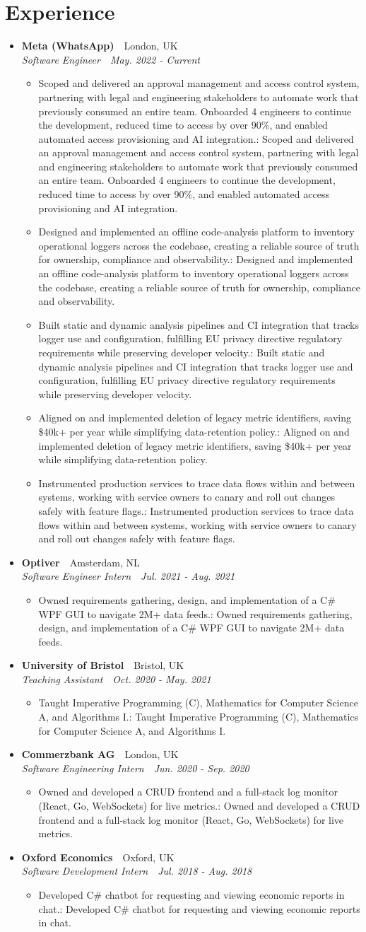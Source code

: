 \documentclass[a4paper,11pt]{article}
\def\ifempty#1{\def\temp{#1}\ifx\temp\empty}
\newcommand{\resumeItem}[2]{
  \item\small{
    \ifempty{#1}#2\else\textbf{#1}{: #2\vspace{-2pt}}\fi
  }
}
\newcommand{\resumeSubheading}[4]{
  \vspace{-1pt}\item[]
    \textbf{#1}~\hfill~#2 \\
    \textit{\small#3}~\hfill~\textit{\small#4}
  \vspace{-5pt}
}
\newcommand{\resumeSubHeadingListStart}{\begin{itemize}[leftmargin=0pt, label={}, itemindent=0pt]}
\newcommand{\resumeSubHeadingListEnd}{\end{itemize}}
\newcommand{\resumeItemListStart}{\begin{itemize}[leftmargin=0.15in]}
\newcommand{\resumeItemListEnd}{\end{itemize}\vspace{-5pt}}
\begin{document}
\section{Experience}
  \resumeSubHeadingListStart
    \resumeSubheading
      {Meta (WhatsApp)}{London, UK}
      {Software Engineer}{May. 2022 - Current}
      \resumeItemListStart
        \resumeItem{}
          {Scoped and delivered an approval management and access control system, partnering with legal and engineering stakeholders to automate work that previously consumed an entire team. Onboarded 4 engineers to continue the development, reduced time to access by over 90\%, and enabled automated access provisioning and AI integration.}
      	\resumeItem{}
          {Designed and implemented an offline code-analysis platform to inventory operational loggers across the codebase, creating a reliable source of truth for ownership, compliance and observability.}
        \resumeItem{}
          {Built static and dynamic analysis pipelines and CI integration that tracks logger use and configuration, fulfilling EU privacy directive regulatory requirements while preserving developer velocity.}
      	\resumeItem{}
          {Aligned on and implemented deletion of legacy metric identifiers, saving \$40k+ per year while simplifying data-retention policy.}
        \resumeItem{}
          {Instrumented production services to trace data flows within and between systems, working with service owners to canary and roll out changes safely with feature flags.}
      \resumeItemListEnd
    \resumeSubheading
      {Optiver}{Amsterdam, NL}
      {Software Engineer Intern}{Jul. 2021 - Aug. 2021}
      \resumeItemListStart
      	\resumeItem{}
          {Owned requirements gathering, design, and implementation of a C\# WPF GUI to navigate 2M+ data feeds.}
      \resumeItemListEnd
    \resumeSubheading
      {University of Bristol}{Bristol, UK}
      {Teaching Assistant}{Oct. 2020 - May. 2021}
      \resumeItemListStart
      	\resumeItem{}
          {Taught Imperative Programming (C), Mathematics for Computer Science A, and Algorithms I.}
      \resumeItemListEnd
    \resumeSubheading
      {Commerzbank AG}{London, UK}
      {Software Engineering Intern}{Jun. 2020 - Sep. 2020}
      \resumeItemListStart
      	\resumeItem{}
          {Owned and developed a CRUD frontend and a full-stack log monitor (React, Go, WebSockets) for live metrics.}
      \resumeItemListEnd
    \resumeSubheading
      {Oxford Economics}{Oxford, UK}
      {Software Development Intern}{Jul. 2018 - Aug. 2018}
      \resumeItemListStart
      	\resumeItem{}
          {Developed C\# chatbot for requesting and viewing economic reports in chat.}
      \resumeItemListEnd
  \resumeSubHeadingListEnd
\end{document}
